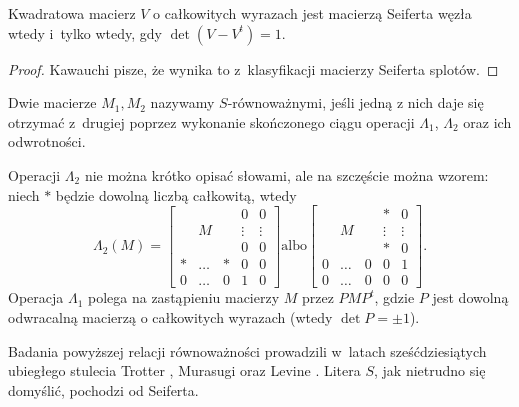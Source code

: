 \begin{proposition}
    Kwadratowa macierz $V$ o całkowitych wyrazach jest macierzą Seiferta węzła wtedy i~tylko wtedy, gdy $\det(V - V^t) = 1$.
\end{proposition}

\begin{proof}
    Kawauchi \cite[s. 62]{kawauchi1996} pisze, że wynika to z~klasyfikacji macierzy Seiferta splotów.
\end{proof}

\begin{definition}
%
%
    Dwie macierze $M_1, M_2$ nazywamy $S$-równoważnymi, jeśli jedną z nich daje się otrzymać z~drugiej poprzez wykonanie skończonego ciągu operacji $\Lambda_1$, $\Lambda_2$ oraz ich odwrotności.

    Operacji $\Lambda_2$ nie można krótko opisać słowami, ale na szczęście można wzorem: niech $*$ będzie dowolną liczbą całkowitą, wtedy
    \begin{equation}
        \Lambda_2 (M) = \begin{bmatrix}
  &   &  & 0 & 0 \\
  & M &  & \vdots & \vdots \\
  &   &  & 0 & 0 \\
* & \dots & * & 0 & 0 \\
0 & \dots & 0 & 1 & 0
\end{bmatrix} \textrm{albo} \begin{bmatrix}
  &   &  & * & 0 \\
  & M &  & \vdots & \vdots \\
  &   &  & * & 0 \\
0 & \dots & 0 & 0 & 1 \\
0 & \dots & 0 & 0 & 0
\end{bmatrix}.
    \end{equation}
    Operacja $\Lambda_1$ polega na zastąpieniu macierzy $M$ przez $PMP^t$, gdzie $P$ jest dowolną odwracalną macierzą o całkowitych wyrazach (wtedy $\det P = \pm 1$).
\end{definition}

Badania powyższej relacji równoważności prowadzili w~latach sześćdziesiątych ubiegłego stulecia Trotter \cite{trotter1962}, Murasugi \cite{murasugi1965} oraz Levine \cite{levine1970}.
%
%
%
Litera $S$, jak nietrudno się domyślić, pochodzi od Seiferta.

